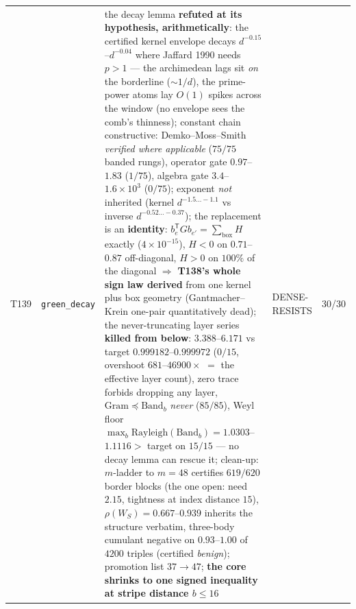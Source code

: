\documentclass[11pt,a4paper]{article}
\begin{document}
{\begin{xltabular}{\linewidth}{@{}p{0.95cm} >{\raggedright\arraybackslash}p{3.1cm} Y >{\raggedright\scriptsize\arraybackslash}p{3.35cm} p{1.15cm}@{}}
T139 & \texttt{\scriptsize green\_\allowbreak decay} & the decay lemma \textbf{refuted at its hypothesis, arithmetically}: the certified kernel envelope decays $d^{-0.15}$--$d^{-0.04}$ where Jaffard 1990 needs $p>1$ --- the archimedean lags sit \emph{on} the borderline ($\sim1/d$), the prime-power atoms lay $O(1)$ spikes across the window (no envelope sees the comb's thinness); constant chain constructive: Demko--Moss--Smith \emph{verified where applicable} ($75/75$ banded rungs), operator gate $0.97$--$1.83$ ($1/75$), algebra gate $3.4$--$1.6\times10^{3}$ ($0/75$); exponent \emph{not} inherited (kernel $d^{-1.5\ldots-1.1}$ vs inverse $d^{-0.52\ldots-0.37}$); the replacement is an \textbf{identity}: $b_e^{\mathsf T}Gb_{e'}=\sum_{\mathrm{box}}H$ exactly ($4\times10^{-15}$), $H<0$ on $0.71$--$0.87$ off-diagonal, $H>0$ on $100\%$ of the diagonal $\Rightarrow$ \textbf{T138's whole sign law derived} from one kernel plus box geometry (Gantmacher--Krein one-pair quantitatively dead); the never-truncating layer series \textbf{killed from below}: $3.388$--$6.171$ vs target $0.999182$--$0.999972$ ($0/15$, overshoot $681$--$46900\times$ $=$ the effective layer count), zero trace forbids dropping any layer, $\mathrm{Gram}\preceq\mathrm{Band}_b$ \emph{never} ($85/85$), Weyl floor $\max_b\mathrm{Rayleigh}(\mathrm{Band}_b)=1.0303$--$1.1116>$ target on $15/15$ --- no decay lemma can rescue it; clean-up: $m$-ladder to $m=48$ certifies $619/620$ border blocks (the one open: need $2.15$, tightness at index distance $15$), $\rho(W_S)=0.667$--$0.939$ inherits the structure verbatim, three-body cumulant negative on $0.93$--$1.00$ of $4200$ triples (certified \emph{benign}); promotion list $37\to47$; \textbf{the core shrinks to one signed inequality at stripe distance $b\le16$} & DENSE-RESISTS & 30/30\\

\end{xltabular}}
\end{document}

